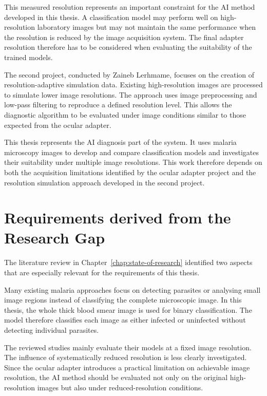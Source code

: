 This measured resolution represents an important constraint for the AI method developed in this thesis. A classification model may perform well on high-resolution laboratory images but may not maintain the same performance when the resolution is reduced by the image acquisition system. The final adapter resolution therefore has to be considered when evaluating the suitability of the trained models.

The second project, conducted by Zaineb Lerhmame, focuses on the creation of resolution-adaptive simulation data. Existing high-resolution images are processed to simulate lower image resolutions. The approach uses image preprocessing and low-pass filtering to reproduce a defined resolution level. This allows the diagnostic algorithm to be evaluated under image conditions similar to those expected from the ocular adapter.

This thesis represents the AI diagnosis part of the system. It uses malaria microscopy images to develop and compare classification models and investigates their suitability under multiple image resolutions. This work therefore depends on both the acquisition limitations identified by the ocular adapter project and the resolution simulation approach developed in the second project.

\section{Requirements derived from the Research Gap}
\label{sec:requirements_research_gap}

The literature review in Chapter~\ref{chap:state-of-research} identified two aspects that are especially relevant for the requirements of this thesis.

Many existing malaria approaches focus on detecting parasites or analysing small image regions instead of classifying the complete microscopic image. In this thesis, the whole thick blood smear image is used for binary classification. The model therefore classifies each image as either infected or uninfected without detecting individual parasites.

The reviewed studies mainly evaluate their models at a fixed image resolution. The influence of systematically reduced resolution is less clearly investigated. Since the ocular adapter introduces a practical limitation on achievable image resolution, the AI method should be evaluated not only on the original high-resolution images but also under reduced-resolution conditions.

